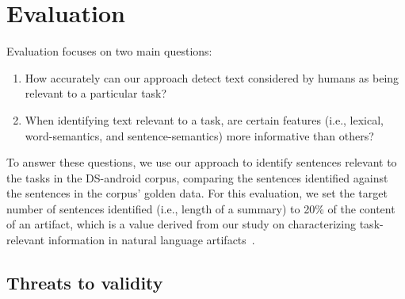 \section{Evaluation}
\label{cp5:evaluation}


Evaluation focuses on two main questions:

\begin{enumerate}
    \item How accurately can our approach detect text considered by humans as being relevant to a particular task?
    
    \item When identifying text relevant to a task, are certain features (i.e., lexical, word-semantics, and sentence-semantics) more informative than others?
\end{enumerate}


To answer these questions, we use our approach to identify sentences relevant to
the tasks in the \acs{DS-android} corpus,
comparing the sentences identified against the 
sentences in the corpus' golden data. 
For this evaluation, we set the target number of sentences identified (i.e., length of a summary) to 20\% of the content of an artifact,
which is a value derived from our study on characterizing 
task-relevant information in natural language artifacts~\cite{marques2020}.











\subsection{Threats to validity}


